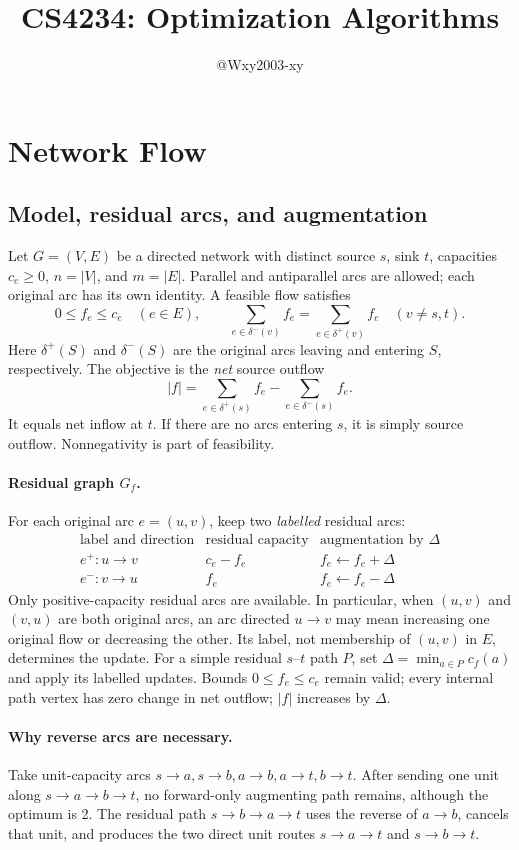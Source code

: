 \documentclass[10pt]{article}
\title{CS4234: Optimization Algorithms}
\author{@Wxy2003-xy}
\date{}
\theoremstyle{definition}
\begin{document}
\section{Network Flow}\label{nf:chapter}

\subsection{Model, residual arcs, and augmentation}\label{nf:model}
Let $G=(V,E)$ be a directed network with distinct source $s$, sink $t$,
capacities $c_e\ge0$, $n=|V|$, and $m=|E|$. Parallel and antiparallel arcs
are allowed; each original arc has its own identity. A feasible flow satisfies
\[
  0\le f_e\le c_e\quad(e\in E),\qquad
  \sum_{e\in\delta^-(v)}f_e=\sum_{e\in\delta^+(v)}f_e
  \quad(v\ne s,t).
\]
Here $\delta^+(S)$ and $\delta^-(S)$ are the original arcs leaving and entering
$S$, respectively. The objective is the \emph{net} source outflow
\[
  |f|=\sum_{e\in\delta^+(s)}f_e-\sum_{e\in\delta^-(s)}f_e.
\]
It equals net inflow at $t$. If there are no arcs entering $s$, it is simply
source outflow. Nonnegativity is part of feasibility.

\paragraph{Residual graph $G_f$.}
For each original arc $e=(u,v)$, keep two \emph{labelled} residual arcs:
\[
\begin{array}{c|c|c}
\text{label and direction}&\text{residual capacity}&\text{augmentation by }\Delta\\\hline
 e^+:u\to v&c_e-f_e&f_e\gets f_e+\Delta\\
 e^-:v\to u&f_e&f_e\gets f_e-\Delta
\end{array}
\]
Only positive-capacity residual arcs are available. In particular, when
$(u,v)$ and $(v,u)$ are both original arcs, an arc directed $u\to v$ may
mean increasing one original flow or decreasing the other. Its label, not
membership of $(u,v)$ in $E$, determines the update.
For a simple residual $s$--$t$ path $P$, set
$\Delta=\min_{a\in P}c_f(a)$ and apply its labelled updates.
Bounds $0\le f_e\le c_e$ remain valid; every internal path vertex has zero
change in net outflow; $|f|$ increases by $\Delta$.

\paragraph{Why reverse arcs are necessary.}
Take unit-capacity arcs $s\to a,s\to b,a\to b,a\to t,b\to t$.
After sending one unit along $s\to a\to b\to t$, no forward-only
augmenting path remains, although the optimum is 2. The residual path
$s\to b\to a\to t$ uses the reverse of $a\to b$, cancels that unit, and
produces the two direct unit routes $s\to a\to t$ and $s\to b\to t$.
\end{document}
